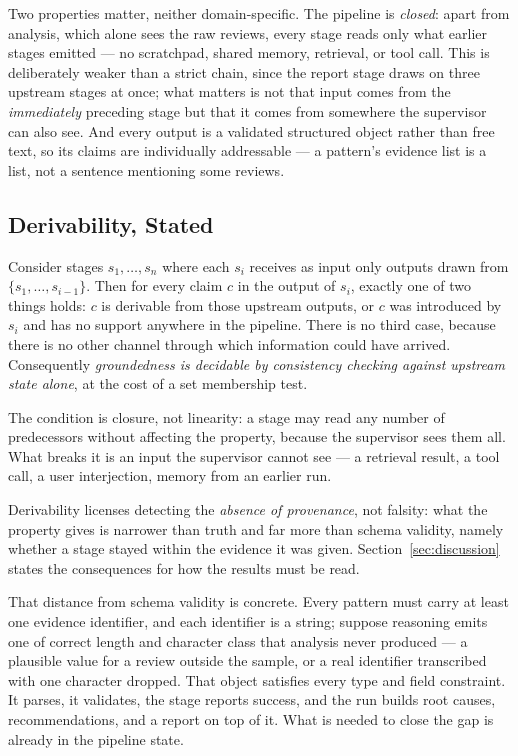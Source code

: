 \documentclass[runningheads]{llncs}
\begin{document}
Two properties matter, neither domain-specific. The pipeline is \emph{closed}:
apart from analysis, which alone sees the raw reviews, every stage reads only
what earlier stages emitted --- no scratchpad, shared memory, retrieval, or tool
call. This is deliberately weaker than a strict chain, since the report stage
draws on three upstream stages at once; what matters is not that input comes from
the \emph{immediately} preceding stage but that it comes from somewhere the
supervisor can also see. And every output is a validated structured object rather
than free text, so its claims are individually addressable --- a pattern's
evidence list is a list, not a sentence mentioning some reviews.

\subsection{Derivability, Stated}
\label{sec:derivability}

Consider stages $s_1, \dots, s_n$ where each $s_i$ receives as input only outputs
drawn from $\{s_1, \dots, s_{i-1}\}$. Then for every claim $c$ in the output of
$s_i$, exactly one of two things holds: $c$ is derivable from those upstream
outputs, or $c$ was introduced by $s_i$ and has no support anywhere in the
pipeline. There is no third case, because there is no other channel through which
information could have arrived. Consequently \emph{groundedness is decidable by
consistency checking against upstream state alone}, at the cost of a set
membership test.

The condition is closure, not linearity: a stage may read any number of
predecessors without affecting the property, because the supervisor sees them
all. What breaks it is an input the supervisor cannot see --- a retrieval result,
a tool call, a user interjection, memory from an earlier run.

Derivability licenses detecting the \emph{absence of provenance}, not falsity:
what the property gives is narrower than truth and far more than schema validity,
namely whether a stage stayed within the evidence it was given.
Section~\ref{sec:discussion} states the consequences for how the results must be
read.

\label{sec:validity-gap}%
That distance from schema validity is concrete. Every pattern must carry at least
one evidence identifier, and each identifier is a string; suppose reasoning emits
one of correct length and character class that analysis never produced --- a
plausible value for a review outside the sample, or a real identifier transcribed
with one character dropped. That object satisfies every type and field
constraint. It parses, it validates, the stage reports success, and the run
builds root causes, recommendations, and a report on top of it. What is needed to
close the gap is already in the pipeline state.
\end{document}
